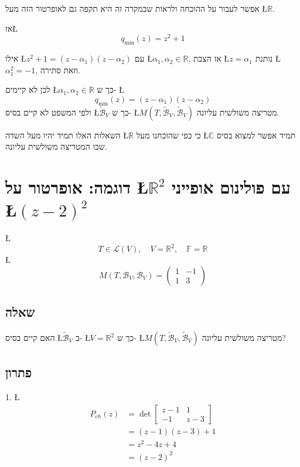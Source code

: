 \documentclass[english,hebrew]{article}
\begin{document}
אפשר לעבור על ההוכחה ולראות שבמקרה זה היא תקפה גם לאופרטור הזה מעל
\L{$\mathbb{R}$}.

אז\L{%
\[
q_{\min}(z)=z^{2}+1
\]
}%

אילו \L{$z^{2}+1=(z-\alpha_{1})(z-\alpha_{2})$} עם \L{$\alpha_{1},\alpha_{2}\in\mathbb{R}$},
אז הצבת \L{$z=\alpha_{1}$} נותנת \L{$\alpha_{1}^{2}=-1$}, וזאת סתירה.

לכן לא קיימים \L{$\alpha_{1},\alpha_{2}\in\mathbb{R}$} כך ש- \L{%
\[
q_{\min}(z)=(z-\alpha_{1})(z-\alpha_{2})
\]
}%
ולפי המשפט לא קיים בסיס \L{$\widetilde{\mathcal{B}}_{V}$} כך ש- \L{$M(T,\widetilde{\mathcal{B}}_{V},\widetilde{\mathcal{B}}_{V})$}
מטריצה משולשית עליונה.

השאלות האלו תמיד יהיו מעל השדה \L{$\mathbb{R}$} כי כפי שהוכחנו מעל
\L{$\mathbb{C}$} תמיד אפשר למצוא בסיס שבו המטריצה משולשית עליונה.

\section{דוגמה: אופרטור על \L{$\mathbb{R}^{2}$} עם פולינום אופייני \L{$(z-2)^{2}$}}

\L{%
\[
T\in\mathcal{L}(V),\quad V=\mathbb{R}^{2},\quad\mathbb{F}=\mathbb{R}
\]
}%
\L{%
\[
M(T,\mathcal{B}_{V},\mathcal{B}_{V})=\begin{pmatrix}1 & -1\\
1 & 3
\end{pmatrix}
\]
}%

\subsection{שאלה}

האם קיים בסיס \L{$\widetilde{\mathcal{B}}_{V}$} ב- \L{$V=\mathbb{R}^{2}$}
כך ש- \L{$M(T,\widetilde{\mathcal{B}}_{V},\widetilde{\mathcal{B}}_{V})$}
מטריצה משולשית עליונה?

\subsection{פתרון}

1. \L{%
\begin{align*}
P_{ch}(z) & =\det\begin{bmatrix}z-1 & 1\\
-1 & z-3
\end{bmatrix}\\
 & =(z-1)(z-3)+1\\
 & =z^{2}-4z+4\\
 & =(z-2)^{2}
\end{align*}
}%
\end{document}
